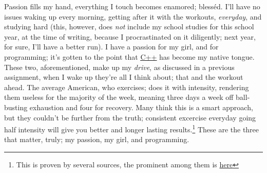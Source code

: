\documentclass[12pt]{article}
\begin{document}
Passion fills my hand, everything I touch becomes enamored; blesséd.
I'll have no issues waking up every morning, getting after it with the workouts, \textit{everyday}, and studying hard 
    (this, however, does \textit{not} include my school studies for this school year, at the time of writing, because I procrastinated on it diligently; next year, for sure, I'll have a better run).
I have a passion for my girl, and for programming; it's gotten to the point that {\color{blue}\underline{\href{https://www.geeksforgeeks.org/c-plus-plus/}{C++}}} has become my native tongue.
These two, aforementioned, make up my \textit{drive}, as discussed in a previous assignment, when I wake up they're all I think about; that and the workout ahead.
The average American, who exercises; does it with intensity, rendering them useless for the majority of the week, meaning three days a week off ball-busting exhaustion and four for recovery.
Many think this is a smart approach, but they couldn't be further from the truth; consistent excercise everyday going half intensity will give you better and longer lasting 
    results.\footnote{This is proven by several sources, the prominent among them is \href{https://www.healthline.com/health/exercise-fitness/working-out-every-day#benefits}{here}}
These are the three that matter, truly; my passion, my girl, and programming.
\end{document}
